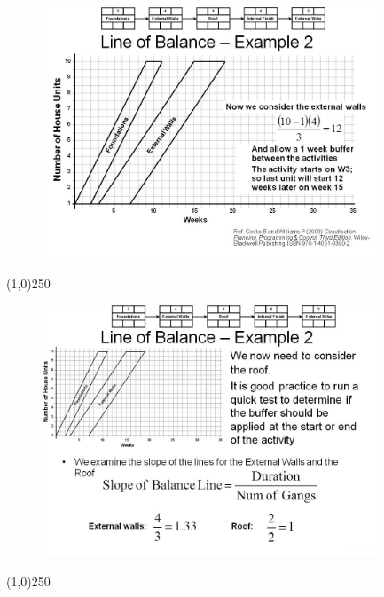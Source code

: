 \begin{frame}
\begin{figure}
	\centering
		\includegraphics[width = 10.0cm]{oldnotes/Slide259.jpg}
\end{figure}
\end{frame}
\begin{center}\line(1,0){250}\end{center}






\begin{frame}
\begin{figure}
	\centering
		\includegraphics[width = 10.0cm]{oldnotes/Slide260.jpg}
\end{figure}
\end{frame}
\begin{center}\line(1,0){250}\end{center}






